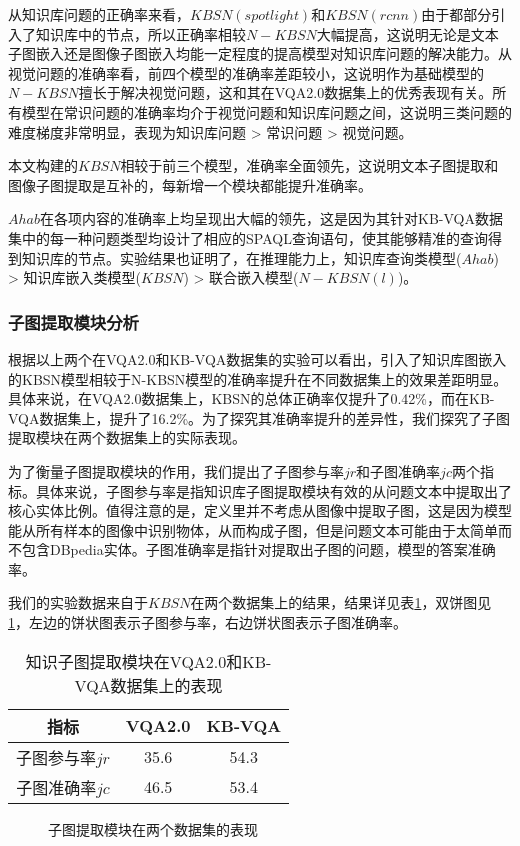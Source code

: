 从知识库问题的正确率来看，$KBSN(spotlight)$和$KBSN(rcnn)$由于都部分引入了知识库中的节点，所以正确率相较$N-KBSN$大幅提高，这说明无论是文本子图嵌入还是图像子图嵌入均能一定程度的提高模型对知识库问题的解决能力。从视觉问题的准确率看，前四个模型的准确率差距较小，这说明作为基础模型的$N-KBSN$擅长于解决视觉问题，这和其在VQA2.0数据集上的优秀表现有关。所有模型在常识问题的准确率均介于视觉问题和知识库问题之间，这说明三类问题的难度梯度非常明显，表现为知识库问题 > 常识问题 > 视觉问题。

本文构建的$KBSN$相较于前三个模型，准确率全面领先，这说明文本子图提取和图像子图提取是互补的，每新增一个模块都能提升准确率。

$Ahab$在各项内容的准确率上均呈现出大幅的领先，这是因为其针对KB-VQA数据集中的每一种问题类型均设计了相应的SPAQL查询语句，使其能够精准的查询得到知识库的节点。实验结果也证明了，在推理能力上，知识库查询类模型($Ahab$) > 知识库嵌入类模型($KBSN$) > 联合嵌入模型($N-KBSN(l)$)。

\subsubsection{子图提取模块分析}
根据以上两个在VQA2.0和KB-VQA数据集的实验可以看出，引入了知识库图嵌入的KBSN模型相较于N-KBSN模型的准确率提升在不同数据集上的效果差距明显。具体来说，在VQA2.0数据集上，KBSN的总体正确率仅提升了0.42\%，而在KB-VQA数据集上，提升了16.2\%。为了探究其准确率提升的差异性，我们探究了子图提取模块在两个数据集上的实际表现。

为了衡量子图提取模块的作用，我们提出了子图参与率$jr$和子图准确率$jc$两个指标。具体来说，子图参与率是指知识库子图提取模块有效的从问题文本中提取出了核心实体比例。值得注意的是，定义里并不考虑从图像中提取子图，这是因为模型能从所有样本的图像中识别物体，从而构成子图，但是问题文本可能由于太简单而不包含DBpedia实体。子图准确率是指针对提取出子图的问题，模型的答案准确率。


我们的实验数据来自于$KBSN$在两个数据集上的结果，结果详见表\ref{kbsn_compr}，双饼图见\ref{kbsn_graph}，左边的饼状图表示子图参与率，右边饼状图表示子图准确率。
\begin{table}[H]
\centering
\caption{知识子图提取模块在VQA2.0和KB-VQA数据集上的表现}
\begin{tabular}{ccc}
\toprule
指标 & VQA2.0 & KB-VQA \\
\midrule
子图参与率$jr$&  35.6& 54.3 \\
子图准确率$jc$&  46.5& 53.4 \\
\bottomrule
\end{tabular}
\label{kbsn_compr}
\end{table}
\begin{figure}[H]
	\centering
	\caption{子图提取模块在两个数据集的表现}
	\label{kbsn_graph}
\end{figure}

